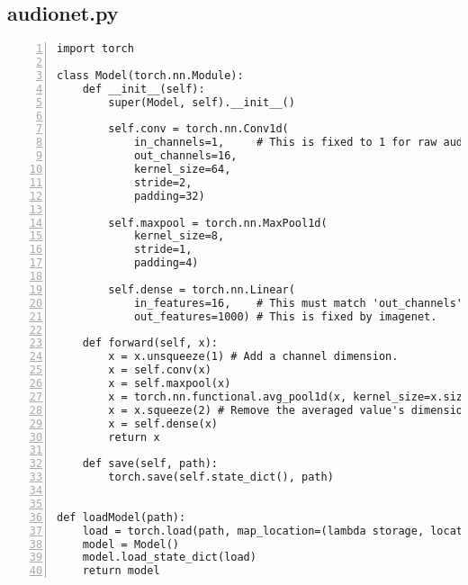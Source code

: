 \subsection{audionet.py}
\label{subsec:audionet.py}

{\setlength{\fboxsep}{10pt}
\scriptsize
\begin{Verbatim}[frame=leftline, numbers=left, xleftmargin=5mm]
import torch

class Model(torch.nn.Module):
    def __init__(self):
        super(Model, self).__init__()

        self.conv = torch.nn.Conv1d(
            in_channels=1,     # This is fixed to 1 for raw audio input.
            out_channels=16,
            kernel_size=64,
            stride=2,
            padding=32)

        self.maxpool = torch.nn.MaxPool1d(
            kernel_size=8,
            stride=1,
            padding=4)

        self.dense = torch.nn.Linear(
            in_features=16,    # This must match 'out_channels' from self.conv.
            out_features=1000) # This is fixed by imagenet.

    def forward(self, x):
        x = x.unsqueeze(1) # Add a channel dimension.
        x = self.conv(x)
        x = self.maxpool(x)
        x = torch.nn.functional.avg_pool1d(x, kernel_size=x.size()[2])
        x = x.squeeze(2) # Remove the averaged value's dimension.
        x = self.dense(x)
        return x

    def save(self, path):
        torch.save(self.state_dict(), path)


def loadModel(path):
    load = torch.load(path, map_location=(lambda storage, location: storage))
    model = Model()
    model.load_state_dict(load)
    return model
\end{Verbatim}
}
